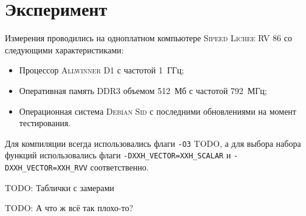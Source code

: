 
\section{Эксперимент}

Измерения проводились на одноплатном компьютере \textsc{Sipeed Lichee RV 86} со следующими характеристиками:
\begin{itemize}
	\item Процессор \textsc{Allwinner D1} с частотой 1~ГГц;
	\item Оперативная память \textsc{DDR3} объемом 512~Мб с частотой 792~МГц;
	\item Операционная система \textsc{Debian Sid} с последними обновлениями на момент тестирования.
\end{itemize}

Для компиляции всегда использовались флаги \texttt{-O3} TODO, а для выбора набора функций использовались флаги \texttt{-DXXH\_VECTOR=XXH\_SCALAR} и \texttt{-DXXH\_VECTOR=XXH\_RVV} соответственно.

TODO: Таблички с замерами

TODO: А что ж всё так плохо-то?
